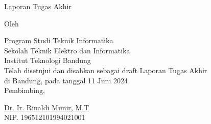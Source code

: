 \clearpage
\pagestyle{empty}

\begin{center}
    \smallskip

    \Large \bfseries \MakeUppercase{\thetitle}
    \vfill

    \Large Laporan Tugas Akhir
    \vfill

    \large Oleh

    \Large \theauthor

    \large Program Studi Teknik Informatika \\

    \normalsize \normalfont
    Sekolah Teknik Elektro dan Informatika \\
    Institut Teknologi Bandung \\

    \vfill
    \normalsize \normalfont
    Telah disetujui dan disahkan sebagai draft Laporan Tugas Akhir \\
    di Bandung, pada tanggal 11 Juni 2024 \\

    \vspace{0.3cm}
    Pembimbing,

    \vspace{2cm}
    \underline{{{Dr. Ir. Rinaldi Munir, M.T}}} \\
    NIP. {{196512101994021001}}

\end{center}
\clearpage

